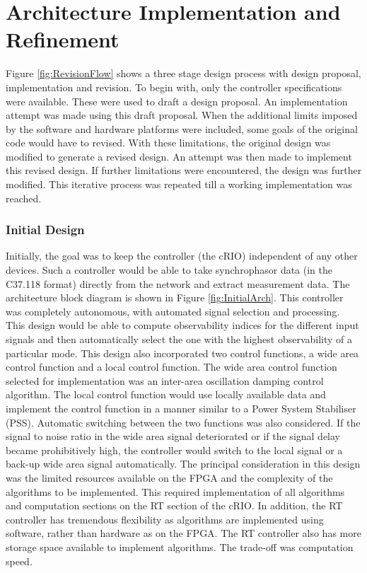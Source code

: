 \documentclass[conference]{IEEEtran}
\begin{document}
\section{Architecture Implementation and Refinement}

Figure \ref{fig:RevisionFlow} shows a three stage design process with design proposal, implementation and revision. To begin with, only the controller specifications were available. These were used to draft a design proposal. An implementation attempt was made using this draft proposal. When the additional limits imposed by the software and hardware platforms were included, some goals of the original code would have to revised. With these limitations, the original design was modified to generate a revised design. An attempt was then made to implement this revised design. If further limitations were encountered, the design was further modified. This iterative process was repeated till a working implementation was reached.\\



\subsubsection{Initial Design}

Initially, the goal was to keep the controller (the cRIO) independent of any other devices. Such a controller would be able to take synchrophasor data (in the C37.118 format) directly from the network and extract measurement data. The architecture block diagram is shown in Figure  \ref{fig:InitialArch}. This controller was completely autonomous, with automated signal selection and processing. This design would be able to compute observability indices for the different input signals and then automatically select the one with the highest observability of a particular mode. This design also incorporated two control functions, a wide area control function and a local control function. The wide area control function selected for implementation was an inter-area oscillation damping control algorithm. The local control function would use locally available data and implement the control function in a manner similar to a Power System Stabiliser (PSS). Automatic switching between the two functions was also considered. If the signal to noise ratio in the wide area signal deteriorated or if the signal delay became prohibitively high, the controller would switch to the local signal or a back-up wide area signal automatically. The principal consideration in this design was the limited resources available on the FPGA and the complexity of the algorithms to be implemented. This required implementation of all algorithms and computation sections on the RT section of the cRIO. In addition, the RT controller has tremendous flexibility as algorithms are implemented using software, rather than hardware as on the FPGA. The RT controller also has more storage space available to implement algorithms. The trade-off was computation speed.\\
\end{document}
